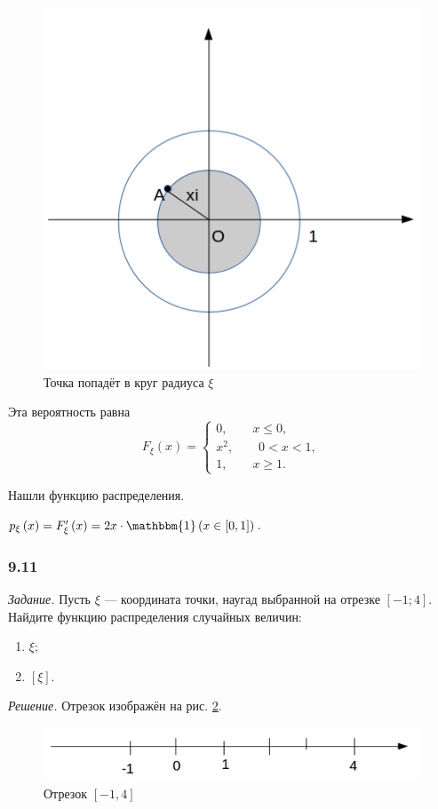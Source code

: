 \begin{figure}[h!]
  \centering
  \includegraphics[width=.4\textwidth]{./pictures/9_10.png}
  \caption{Точка попадёт в круг радиуса $ \xi $}
  \label{fig:910}
\end{figure}

Эта вероятность равна
$$F_{ \xi } \left( x \right) =
\begin{cases}
0, \qquad x \leq 0, \\
x^2, \qquad 0 < x < 1, \\
1, \qquad x \geq 1.
\end{cases}$$

Нашли функцию распределения.

$p_{ \xi } \left( x \right) =
F_{ \xi }' \left( x \right) =
2x \cdot \mathbbm{1} \left( x \in \left[ 0, 1 \right] \right) $.

\subsubsection*{9.11}

\textit{Задание.} Пусть $ \xi $ --- координата точки, наугад выбранной на отрезке $ \left[ -1; 4 \right] $.
Найдите функцию распределения случайных величин:
\begin{enumerate}[label=\alph*)]
\item $ \xi $;
\item $ \left[ \xi \right] $. 
\end{enumerate}

\textit{Решение.} Отрезок изображён на рис. \ref{fig:911}.

\begin{figure}[h!]
  \centering
  \includegraphics[width=.4\textwidth]{./pictures/9_11.png}
  \caption{Отрезок $ \left[ -1, 4 \right] $}
  \label{fig:911}
\end{figure}

